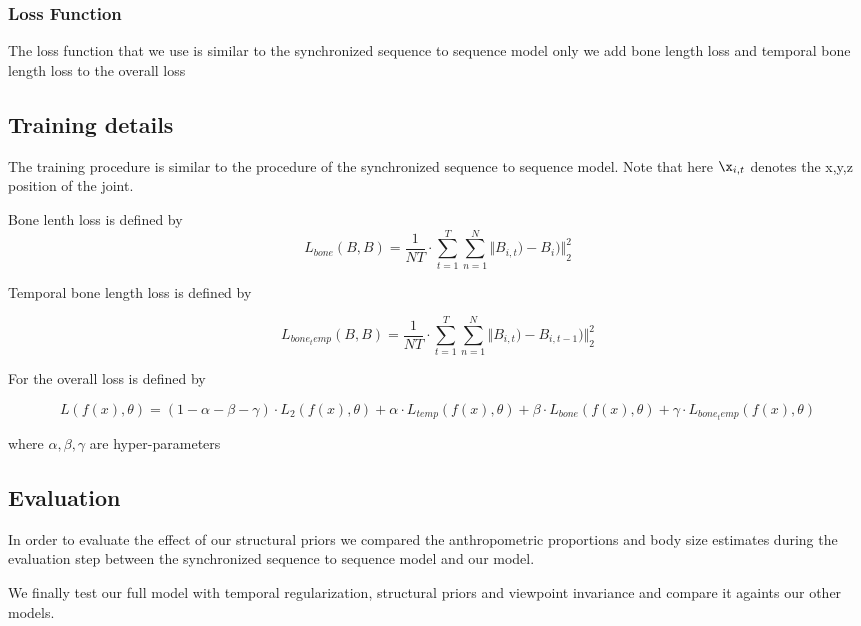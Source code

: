 \subsubsection{Loss Function}

The loss function that we use is similar to the synchronized sequence to sequence model only we add bone length loss and temporal bone length loss to the overall loss

\subsection{Training details}

The training procedure is similar to the procedure of the synchronized sequence to sequence model. Note that here $\x_{i,t}$ denotes the x,y,z position of the joint.

Bone lenth loss is defined by
\begin{equation}	
    L_{bone}(B,B) = \frac{1}{NT} \cdot \sum_{t=1}^{T} \sum_{n=1}^{N} {\Vert B_{i,t})-B_{i}) \Vert}_2^2
\end{equation}

Temporal bone length loss is defined by

\begin{equation}	
    L_{bone_temp}(B,B) = \frac{1}{NT} \cdot \sum_{t=1}^{T} \sum_{n=1}^{N} {\Vert B_{i,t})-B_{i,t-1}) \Vert}_2^2
\end{equation}

For the overall loss is defined by

\begin{equation}	
    L(f(x),\theta) = (1-\alpha-\beta-\gamma) \cdot L_2(f(x),\theta) + \alpha \cdot L_{temp}(f(x),\theta) + \beta \cdot L_{bone}(f(x),\theta) + \gamma \cdot L_{bone_temp}(f(x),\theta)
\end{equation}

where $\alpha,\beta,\gamma$ are hyper-parameters

\subsection{Evaluation}

In order to evaluate the effect of our structural priors we compared the anthropometric proportions and body size estimates during the evaluation step between the synchronized sequence to sequence model and our model.

We finally test our full model with temporal regularization, structural priors and viewpoint invariance and compare it againts our other models.

